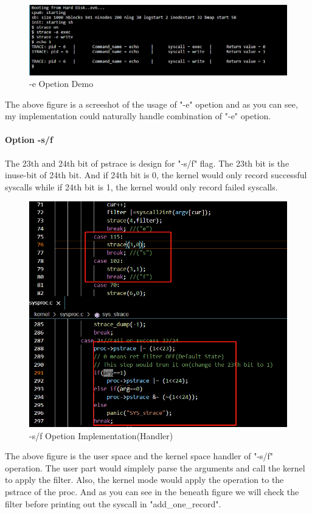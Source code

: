 \documentclass[11pt,oneside,a4paper]{article}
\begin{document}
\begin{figure}[H]
    \includegraphics[width=4.75in]{1-21.png}
    \centering
    \caption{-e Opetion Demo}
\end{figure}


The above figure is a screeshot of the usage of "-e" opetion and as you can see, 
my implementation could naturally handle combination of "-e" opetion.

\paragraph*{Option -s/f}

The 23th and 24th bit of pstrace is design for "-s/f" flag. The 23th bit is the 
inuse-bit of 24th bit. And if 24th bit is 0, the kernel would only record successful
syscalls while if 24th bit is 1, the kernel would only record failed syscalls.

\begin{figure}[H]
    \includegraphics[width=4.75in]{1-22.png}
    \centering
    \caption{-s/f Opetion Implementation(Handler)}
\end{figure}

The above figure is the user space and the kernel space handler of "-s/f" operation.
The user part would simplely parse the arguments and call the kernel to apply the filter.
Also, the kernel mode would apply the operation to the pstrace of the proc. And as you
can see in the beneath figure we will check the filter before printing out the syscall in "add\_one\_record".
\end{document}

